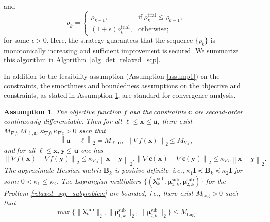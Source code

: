 \documentclass[aos]{imsart}
\numberwithin{equation}{section}
\theoremstyle{plain}
\newtheorem{assumption}{Assumption}
\begin{document}
and
\begin{equation*}
    \rho_k = \left\{ \begin{array}{cc}
        \rho_{k-1}, &  \text{if}~\rho_{k}^{\text{trial}} \leq \rho_{k-1}, \\
        (1+\epsilon)\rho_{k}^{\text{trial}}, & \text{otherwise};
    \end{array} \right.
\end{equation*}
for some $\epsilon > 0$. Here, the strategy guarantees that the sequence $\{\rho_k\}$ is monotonically increasing and sufficient improvement is secured. 
We summarize this algorithm in Algorithm~\ref{alg_det_relaxed_sqp}.

In addition to the feasibility assumption (Assumption \ref{assump1}) on the constraints, the smoothness and boundedness assumptions on the objective and constraints, as stated in Assumption \ref{assump2}, are standard for convergence analysis. 


\begin{assumption}
    \label{assump2}
    The objective function $f$ and the constraints $\bm{c}$ are second-order continuously differentiable. Then for all $\bm{\ell} \leq \bm{x} \leq \bm{u}$, there exist $M_{\nabla f}, M_{\bm{\ell},\bm{u}}, \kappa_{\nabla f}, \kappa_{\nabla c}>0$ such that
    \begin{equation*}
        \left\|\bm{u} - \bm{\ell} \right\|_2 = M_{\bm{\ell},\bm{u}},~\left\| \nabla f(\bm{x})\right\|_2 \leq M_{\nabla f},
    \end{equation*}
    and for all $\bm{\ell} \leq \bm{x}, \bm{y} \leq \bm{u}$ one has
    \begin{equation*}
        \left\|\nabla f(\bm{x})-\nabla f(\bm{y}) \right\|_2 \leq \kappa_{\nabla f} \left\|\bm{x} - \bm{y} \right\|_2, \left\|\nabla \bm{c}(\bm{x})-\nabla \bm{c}(\bm{y}) \right\|_2 \leq \kappa_{\nabla c} \left\|\bm{x} - \bm{y} \right\|_2.
    \end{equation*}
    The approximate Hessian matrix $\bm{B}_k$ is positive definite, i.e., $\kappa_1 \mathbf{I} \preceq \bm{B}_k \preceq \kappa_2 \mathbf{I}$ for some $0<\kappa_1 \leq \kappa_2$. The Lagrangian multipliers $\{(\bm{\lambda}_{k}^{\text{sub}},  \bm{\mu}_{1,k}^{\text{sub}}, \bm{\mu}_{2,k}^{\text{sub}})\}$ for the Problem \eqref{relaxed_sqp_subproblem} are bounded, i.e., there exist $M_{\text{Lag}}>0$ such that 
    \begin{equation*}
        \max\{\|\bm{\lambda}_{k}^{\text{sub}}\|_2, \|\bm{\mu}_{1,k}^{\text{sub}}\|_2, \|\bm{\mu}_{2,k}^{\text{sub}}\|_2\} \leq M_{\text{Lag}}.
    \end{equation*}
\end{assumption}
\end{document}

